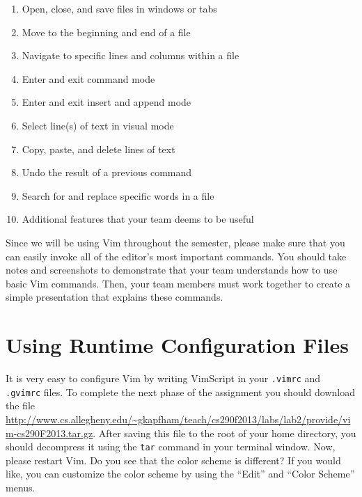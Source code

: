 \begin{enumerate}

	\item Open, close, and save files in windows or tabs

	\item Move to the beginning and end of a file

	\item Navigate to specific lines and columns within a file

	\item Enter and exit command mode

	\item Enter and exit insert and append mode

	\item Select line(s) of text in visual mode

	\item Copy, paste, and delete lines of text

	\item Undo the result of a previous command

	\item Search for and replace specific words in a file 

	\item Additional features that your team deems to be useful

\end{enumerate}

Since we will be using Vim throughout the semester, please make sure that you can easily invoke all of the editor's most
important commands.  You should take notes and screenshots to demonstrate that your team understands how to use basic
Vim commands.  Then, your team members must work together to create a simple presentation that explains these commands. 

\section*{Using Runtime Configuration Files}

It is very easy to configure Vim by writing VimScript in your {\tt .vimrc} and {\tt .gvimrc} files.  To complete the
next phase of the assignment you should download the file
\url{http://www.cs.allegheny.edu/~gkapfham/teach/cs290f2013/labs/lab2/provide/vim-cs290F2013.tar.gz}.  After saving this
file to the root of your home directory, you should decompress it using the {\tt tar} command in your terminal window.
Now, please restart Vim.  Do you see that the color scheme is different? If you would like, you can customize the color
scheme by using the ``Edit'' and ``Color Scheme'' menus. 

